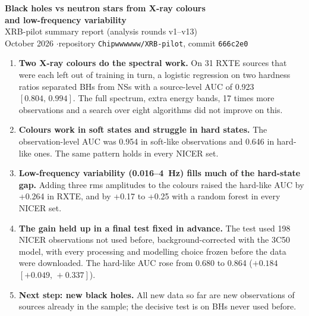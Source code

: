 \documentclass[11pt,a4paper]{article}
\newcommand{\ci}[2]{$[#1,\,#2]$}
\begin{document}
\begin{center}
{\LARGE\bfseries Black holes vs neutron stars from X-ray colours\\[3pt] and low-frequency variability}\\[8pt]
{\large XRB-pilot summary report (analysis rounds v1--v13)}\\[4pt]
{\small October 2026 \quad$\cdot$\quad repository \texttt{Chipwwwwww/XRB-pilot}, commit \texttt{666c2e0}}
\end{center}

\begin{tcolorbox}[colback=blue!3,colframe=blue!40!black,boxrule=0.6pt,arc=2pt,title=Key findings,fonttitle=\bfseries]
\begin{enumerate}[leftmargin=1.4em]
\item \textbf{Two X-ray colours do the spectral work.} On 31 RXTE sources that were each left out of training in turn,
a logistic regression on two hardness ratios separated BHs from NSs with a source-level AUC of 0.923
\ci{0.804}{0.994}. The full spectrum, extra energy bands, 17 times more observations and a search over eight
algorithms did not improve on this.
\item \textbf{Colours work in soft states and struggle in hard states.} The observation-level AUC was 0.954 in
soft-like observations and 0.646 in hard-like ones. The same pattern holds in every NICER set.
\item \textbf{Low-frequency variability (0.016--4~Hz) fills much of the hard-state gap.} Adding three rms amplitudes to
the colours raised the hard-like AUC by +0.264 in RXTE, and by +0.17 to +0.25 with a random forest in every NICER set.
\item \textbf{The gain held up in a final test fixed in advance.} The test used 198 NICER observations not used before,
background-corrected with the 3C50 model, with every processing and modelling choice frozen before the data were
downloaded. The hard-like AUC rose from 0.680 to 0.864 ($+0.184$ \ci{+0.049}{+0.337}).
\item \textbf{Next step: new black holes.} All new data so far are new observations of sources already in the sample;
the decisive test is on BHs never used before.
\end{enumerate}
\end{tcolorbox}
\end{document}
